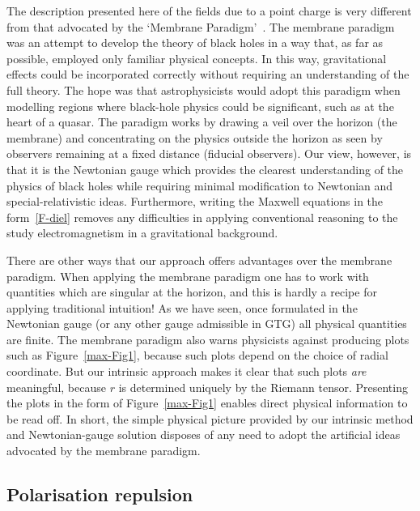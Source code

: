 \documentclass[a4paper]{article}
\numberwithin{equation}{section}
\begin{document}
The description presented here of the fields due to a point charge is
very different from that advocated by the `Membrane
Paradigm'~\cite{tho-mem}.  The membrane paradigm was an attempt to
develop the theory of black holes in a way that, as far as possible,
employed only familiar physical concepts.  In this way, gravitational
effects could be incorporated correctly without requiring an
understanding of the full theory.  The hope was that
astrophysicists would adopt this paradigm when modelling regions where
black-hole physics could be significant, such as at the heart of a
quasar.  The paradigm works by drawing a veil over the horizon (the
membrane) and concentrating on the physics outside the horizon as seen
by observers remaining at a fixed distance (fiducial observers).  Our
view, however, is that it is the Newtonian gauge which provides the
clearest understanding of the physics of black holes while requiring
minimal modification to Newtonian and special-relativistic ideas.
Furthermore, writing the Maxwell equations in the form~\eqref{F-diel}
removes any difficulties in applying conventional reasoning to the
study electromagnetism in a gravitational background.  


There are other ways that our approach offers advantages over the
membrane paradigm.  When applying the membrane paradigm one has to
work with quantities which are singular at the horizon, and this is
hardly a recipe for applying traditional intuition!  As we have seen,
once formulated in the Newtonian gauge (or any other gauge admissible
in GTG) all physical quantities are finite.  The membrane paradigm
also warns physicists against producing plots such as
Figure~\ref{max-Fig1}, because such plots depend on the choice of
radial coordinate.  But our intrinsic approach makes it clear that
such plots \textit{are} meaningful, because $r$ is determined uniquely
by the Riemann tensor.  Presenting the plots in the form of
Figure~\ref{max-Fig1} enables direct physical information to be read
off.  In short, the simple physical picture provided by our intrinsic
method and Newtonian-gauge solution disposes of any need to adopt the
artificial ideas advocated by the membrane paradigm.


\subsection{Polarisation repulsion}
\end{document}
